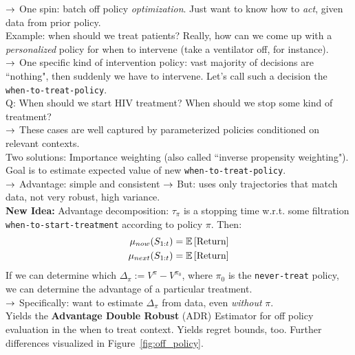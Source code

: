 $\rightarrow$ One spin: batch off policy {\it optimization}. Just want to know how to {\it act}, given data from prior policy. \\

Example: when should we treat patients? Really, how can we come up with a {\it personalized} policy for when to intervene (take a ventilator off, for instance). \\

$\rightarrow$ One specific kind of intervention policy: vast majority of decisions are ``nothing", then suddenly we have to intervene. Let's call such a decision the \texttt{when-to-treat-policy}. \\

Q: When should we start HIV treatment? When should we stop some kind of treatment? \\

$\rightarrow$ These cases are well captured by parameterized policies conditioned on relevant contexts. \\

Two solutions: Importance weighting (also called ``inverse propensity weighting"). Goal is to estimate expected value of new \texttt{when-to-treat-policy}. \\

$\rightarrow$ Advantage: simple and consistent
$\rightarrow$ But: uses only trajectories that match data, not very robust, high variance. \\

{\bf New Idea:} Advantage decomposition: $\tau_\pi$ is a stopping time w.r.t. some filtration \texttt{when-to-start-treatment} according to policy $\pi$. Then:
\begin{align}
\mu_{now}(S_{1:t}) &= \mathbb{E}\left[\text{Return}\right] \\
\mu_{next}(S_{1:t}) &= \mathbb{E}\left[\text{Return}\right]
\end{align}
If we can determine which $\Delta_\pi := V^\pi - V^{\pi_0}$, where $\pi_0$ is the \texttt{never-treat} policy, we can determine the advantage of a particular treatment. \\

$\rightarrow$ Specifically: want to estimate $\Delta_\pi$ from data, even {\it without} $\pi$. \\

Yields the {\bf Advantage Double Robust} (ADR) Estimator for off policy evaluation in the when to treat context. Yields regret bounds, too. Further differences visualized in Figure~\ref{fig:off_policy}.

